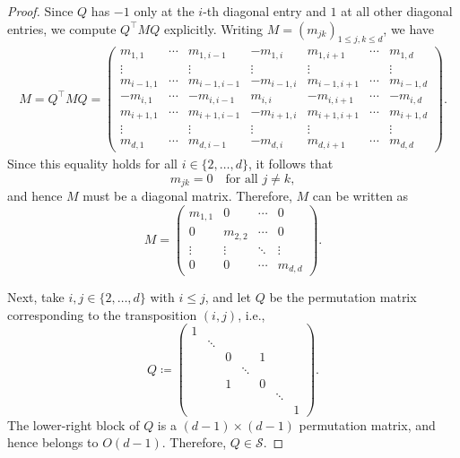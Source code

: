 \documentclass[10pt]{article}
\begin{document}
\begin{proof}
Since $Q$ has $-1$ only at the $i$-th diagonal entry and $1$ at all other
diagonal entries, we compute $Q^\top M Q$ explicitly.
Writing $M=(m_{jk})_{1\leq j,k\leq d}$, we have
\begin{align*}
M
= Q^\top M Q
= \begin{pmatrix}
  m_{1,1} & \cdots & m_{1,i-1} & -m_{1,i} & m_{1,i+1} & \cdots & m_{1,d} \\[4pt]
  \vdots  &        & \vdots    & \vdots   & \vdots    &        & \vdots \\[4pt]
  m_{i-1,1} & \cdots & m_{i-1,i-1} & -m_{i-1,i} & m_{i-1,i+1} & \cdots & m_{i-1,d} \\[6pt]
  -m_{i,1} & \cdots & -m_{i,i-1} & m_{i,i} & -m_{i,i+1} & \cdots & -m_{i,d} \\[6pt]
  m_{i+1,1} & \cdots & m_{i+1,i-1} & -m_{i+1,i} & m_{i+1,i+1} & \cdots & m_{i+1,d} \\[4pt]
  \vdots &        & \vdots & \vdots & \vdots &        & \vdots \\[4pt]
  m_{d,1} & \cdots & m_{d,i-1} & -m_{d,i} & m_{d,i+1} & \cdots & m_{d,d}
\end{pmatrix}.
\end{align*}
Since this equality holds for all $i \in \{2,\dots,d\}$, it follows that
\[
m_{jk}=0 \quad \text{for all } j\neq k,
\]
and hence $M$ must be a diagonal matrix.
Therefore, $M$ can be written as
\[
M=
\begin{pmatrix}
m_{1,1} & 0 & \cdots & 0 \\
0 & m_{2,2} & \cdots & 0 \\
\vdots & \vdots & \ddots & \vdots \\
0 & 0 & \cdots & m_{d,d}
\end{pmatrix}.
\]

Next, take $i,j \in \{2,\dots,d\}$ with $i \le j$, and let $Q$ be the permutation
matrix corresponding to the transposition $(i,j)$, i.e.,
\[
Q\coloneqq
\begin{pmatrix}
1 &        &        &        &        &        &        \\
  & \ddots &        &        &        &        &        \\
  &        & 0      &        & 1      &        &        \\
  &        &        & \ddots &        &        &        \\
  &        & 1      &        & 0      &        &        \\
  &        &        &        &        & \ddots &        \\
  &        &        &        &        &        & 1
\end{pmatrix}.
\]
The lower-right block of $Q$ is a $(d-1)\times(d-1)$ permutation matrix, and
hence belongs to $O(d-1)$.
Therefore, $Q \in \mathcal{S}$.


\end{proof}
\end{document}
